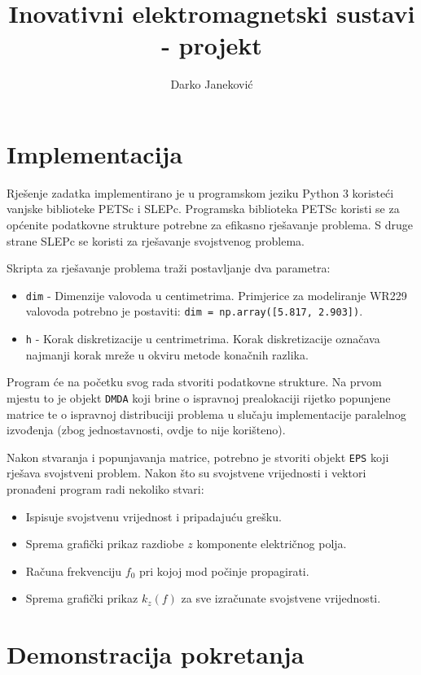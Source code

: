 \documentclass{article}
\title{Inovativni elektromagnetski sustavi - projekt}
\author{Darko Janeković}
\begin{document}
\maketitle

\section{Implementacija}
Rješenje zadatka implementirano je u programskom jeziku Python 3 koristeći
vanjske biblioteke PETSc i SLEPc. Programska biblioteka PETSc koristi se za
općenite podatkovne strukture potrebne za efikasno rješavanje problema. S druge
strane SLEPc se koristi za rješavanje svojstvenog problema.

Skripta za rješavanje problema traži postavljanje dva parametra:
\begin{itemize}
    \item \texttt{dim} - Dimenzije valovoda u centimetrima. Primjerice za
modeliranje WR229 valovoda potrebno je postaviti:
    \texttt{dim = np.array([5.817, 2.903])}.
    \item \texttt{h} - Korak diskretizacije u centrimetrima. Korak
diskretizacije označava najmanji korak mreže u okviru metode konačnih razlika.
\end{itemize}

Program će na početku svog rada stvoriti podatkovne strukture. Na prvom
mjestu to je objekt \texttt{DMDA} koji brine o ispravnoj prealokaciji rijetko
popunjene matrice te o ispravnoj distribuciji problema u slučaju
implementacije paralelnog izvođenja (zbog jednostavnosti, ovdje to nije
korišteno).

Nakon stvaranja i popunjavanja matrice, potrebno je stvoriti objekt
\texttt{EPS} koji rješava svojstveni problem. Nakon što su svojstvene
vrijednosti i vektori pronađeni program radi nekoliko stvari:
\begin{itemize}
    \item Ispisuje svojstvenu vrijednost i pripadajuću grešku.
    \item Sprema grafički prikaz razdiobe $z$ komponente električnog polja.
    \item Računa frekvenciju $f_0$ pri kojoj mod počinje propagirati.
    \item Sprema grafički prikaz $k_z(f)$ za sve izračunate svojstvene vrijednosti.
\end{itemize}

\section{Demonstracija pokretanja}
\end{document}
